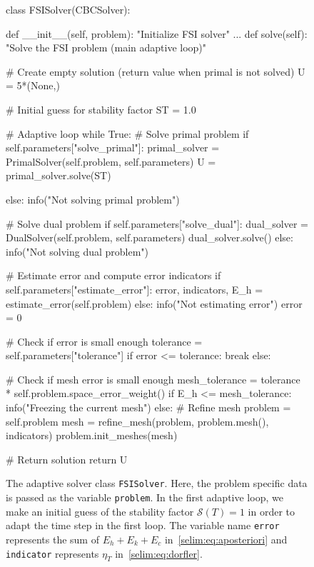 \begin{figure}
\label{selim:fig:FSISolver}
\caption{The adaptive solver class \texttt{FSISolver}. Here, the
  problem specific data is passed as the variable \texttt{problem}. In
  the first adaptive loop, we make an initial guess of the stability
  factor $\mathcal{S}(T)=1$ in order to adapt the time step in the
  first loop.  The variable name \texttt{error} represents the sum of
  $E_h + E_k + E_c$ in~\eqref{selim:eq:aposteriori} and
  \texttt{indicator} represents $\eta_T$ in~\eqref{selim:eq:dorfler}.}
\begin{python}
class FSISolver(CBCSolver):

    def __init__(self, problem):
        "Initialize FSI solver"
            ...
    def solve(self):
        "Solve the FSI problem (main adaptive loop)"

        # Create empty solution (return value when primal is not solved)
        U = 5*(None,)

        # Initial guess for stability factor
        ST = 1.0

        # Adaptive loop
        while True:
            # Solve primal problem
            if self.parameters["solve_primal"]:
                primal_solver = PrimalSolver(self.problem, self.parameters)
                U = primal_solver.solve(ST)

            else:
                info("Not solving primal problem")

            # Solve dual problem
            if self.parameters["solve_dual"]:
                dual_solver = DualSolver(self.problem, self.parameters)
                dual_solver.solve()
            else:
                info("Not solving dual problem")

            # Estimate error and compute error indicators
            if self.parameters["estimate_error"]:
                error, indicators, E_h = estimate_error(self.problem)
            else:
                info("Not estimating error")
                error = 0

            # Check if error is small enough
            tolerance = self.parameters["tolerance"]
            if error <= tolerance:
                break
            else:

            # Check if mesh error is small enough
            mesh_tolerance = tolerance * self.problem.space_error_weight()
            if E_h <= mesh_tolerance:
                info("Freezing the current mesh")
            else:
                # Refine mesh
                problem = self.problem
                mesh = refine_mesh(problem,
                                   problem.mesh(),
                                   indicators)
                problem.init_meshes(mesh)

        # Return solution
        return U
\end{python}
\end{figure}


